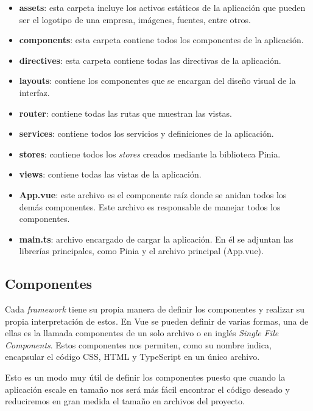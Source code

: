 \begin{itemize}
\item \textbf{assets}: esta carpeta incluye los activos estáticos de la aplicación que pueden ser el logotipo de una empresa, imágenes, fuentes, entre otros.
\item \textbf{components}: esta carpeta contiene todos los componentes de la aplicación.
\item \textbf{directives}: esta carpeta contiene todas las directivas de la aplicación.
\item \textbf{layouts}: contiene los componentes que se encargan del diseño visual de la interfaz.
\item \textbf{router}: contiene todas las rutas que muestran las vistas.
\item \textbf{services}: contiene todos los servicios y definiciones de la aplicación.
\item \textbf{stores}: contiene todos los \textit{stores} creados mediante la biblioteca Pinia.
\item \textbf{views}: contiene todas las vistas de la aplicación.
\item \textbf{App.vue}: este archivo es el componente raíz donde se anidan todos los demás componentes. Este archivo es responsable de manejar todos los componentes.
\item \textbf{main.ts}: archivo encargado de cargar la aplicación. En él se adjuntan las librerías principales, como Pinia y el archivo principal (App.vue).
\end{itemize}

\subsection{Componentes}
Cada \textit{framework} tiene su propia manera de definir los componentes y realizar su propia interpretación de estos. En Vue se pueden definir de varias formas, una de ellas  es la llamada componentes de un solo archivo o en inglés \textit{Single File Components}. Estos componentes nos permiten, como su nombre indica, encapsular el código CSS, HTML y TypeScript en un único archivo.

Esto es un modo muy útil de definir los componentes puesto que cuando la aplicación escale en tamaño nos será más fácil encontrar el código deseado y reduciremos en gran medida el tamaño en archivos del proyecto.

